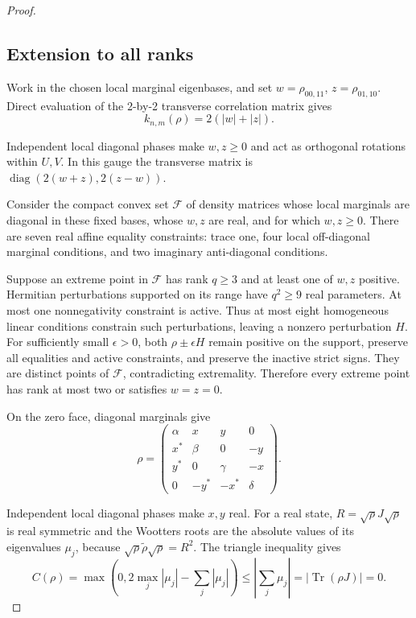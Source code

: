 \documentclass[10pt,letterpaper]{article}
\begin{document}
\begin{proof}
\subsection{Extension to all ranks}

Work in the chosen local marginal eigenbases, and set \(w=\rho_{00,11}\), \(z=\rho_{01,10}\). Direct evaluation of the 2-by-2 transverse correlation matrix gives
\begin{equation}
k_{n,m}(\rho)=2(|w|+|z|).
\label{eq:20}
\end{equation}

Independent local diagonal phases make \(w,z\ge0\) and act as orthogonal rotations within \(U,V\). In this gauge the transverse matrix is \(\operatorname{diag}(2(w+z),2(z-w))\).

Consider the compact convex set \(\mathcal F\) of density matrices whose local marginals are diagonal in these fixed bases, whose \(w,z\) are real, and for which \(w,z\ge0\). There are seven real affine equality constraints: trace one, four local off-diagonal marginal conditions, and two imaginary anti-diagonal conditions.

Suppose an extreme point in \(\mathcal F\) has rank \(q\ge3\) and at least one of \(w,z\) positive. Hermitian perturbations supported on its range have \(q^2\ge9\) real parameters. At most one nonnegativity constraint is active. Thus at most eight homogeneous linear conditions constrain such perturbations, leaving a nonzero perturbation \(H\). For sufficiently small \(\epsilon>0\), both \(\rho\pm\epsilon H\) remain positive on the support, preserve all equalities and active constraints, and preserve the inactive strict signs. They are distinct points of \(\mathcal F\), contradicting extremality. Therefore every extreme point has rank at most two or satisfies \(w=z=0\).

On the zero face, diagonal marginals give
\begin{equation}
\rho=\begin{pmatrix}
\alpha&x&y&0\\x^*&\beta&0&-y\\y^*&0&\gamma&-x\\0&-y^*&-x^*&\delta
\end{pmatrix}.
\label{eq:21}
\end{equation}

Independent local diagonal phases make \(x,y\) real. For a real state, \(R=\sqrt\rho J\sqrt\rho\) is real symmetric and the Wootters roots are the absolute values of its eigenvalues \(\mu_j\), because \(\sqrt\rho\widetilde\rho\sqrt\rho=R^2\). The triangle inequality gives
\begin{equation}
C(\rho)=\max(0,2\max_j|\mu_j|-\sum_j|\mu_j|)
\le\left|\sum_j\mu_j\right|=|\operatorname{Tr}(\rho J)|=0.
\label{eq:22}
\end{equation}


\end{proof}
\end{document}
